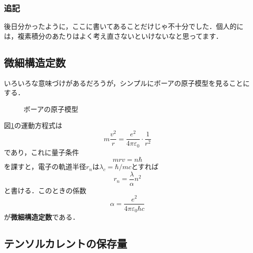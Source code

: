 \documentclass[a4paper,pdflatex,ja=standard]{bxjsarticle}
\begin{document}
\subsubsection{追記}

後日分かったように，ここに書いてあることだけじゃ不十分でした．個人的には，複素積分のあたりはよく考え直さないといけないなと思ってます．

\subsection{微細構造定数}

いろいろな意味づけがあるだろうが，シンプルにボーアの原子模型を見ることにする．

\begin{figure}[ht]
  \centering    
    \caption{ボーアの原子模型}
    \label{bohr}
\end{figure}

図\ref{bohr}の運動方程式は
\begin{equation}
  m\frac{v^2}{r}
  =
  \frac{e^2}{4\pi\varepsilon_{0}}\cdot\frac{1}{r^2}
\end{equation}
であり，これに量子条件
\begin{equation}
  mrv
  =
  n\hbar
\end{equation}
を課すと，電子の軌道半径$r_{n}$は$\lambda_{c}=\hbar/mc$とすれば
\begin{equation}
  r_{n}
  =
  \frac{\lambda}{\alpha}n^2
\end{equation}
と書ける．このときの係数
\begin{equation}
  \alpha
  =
  \frac{e^2}{4\pi\varepsilon_{0}\hbar c}
\end{equation}
が\textbf{微細構造定数}である．

\subsection{テンソルカレントの保存量}
\end{document}
